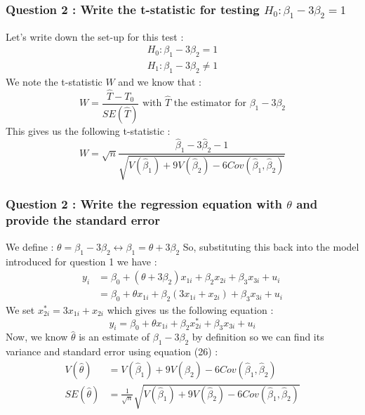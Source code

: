 \documentclass{article}
\begin{document}
\subsubsection{Question 2 : Write the t-statistic for testing $H_0 : \beta_1 -3\beta_2 = 1$ }
Let's write down the set-up for this test : 
\begin{equation}
\begin{aligned}
    H_0 : \beta_1 -3\beta_2 = 1 \\
    H_1 : \beta_1 -3\beta_2 \neq 1
\end{aligned}
\end{equation}
We note the t-statistic $W$ and we know that : 
\begin{equation}
    W = \frac{\hat{T}-T_0}{SE(\hat{T})} \text{ with $\hat{T}$ the estimator for $\beta_1 -3\beta_2$}
\end{equation}
This gives us the following t-statistic : 
\begin{equation}
    W = \sqrt{n}\frac{\hat{\beta}_1 - 3\hat{\beta}_2 - 1}{\sqrt{V(\hat{\beta}_1) + 9V(\hat{\beta}_2) - 6Cov(\hat{\beta}_1, \hat{\beta}_2)}}
\end{equation}

\subsubsection{Question 2 : Write the regression equation with $\theta$ and provide the standard error}
We define : $\theta = \beta_1 - 3\beta_2 \leftrightarrow \beta_1 = \theta + 3\beta_2$
So, substituting this back into the model introduced for question 1 we have : 
\begin{equation}
\begin{aligned}
    y_i &= \beta_0 + (\theta + 3\beta_2)x_{1i} + \beta_2x_{2i} + \beta_3x_{3i} + u_i\\
    &=\beta_0 + \theta x_{1i}+\beta_2(3x_{1i}+x_{2i})+\beta_3x_{3i} + u_i
\end{aligned}
\end{equation}
We set $x_{2i}^*= 3x_{1i}+x_{2i}$ which gives us the following equation : 
\begin{equation}
    y_i = \beta_0 + \theta x_{1i} + \beta_2x_{2i}^* + \beta_3x_{3i}+u_i
\end{equation}
Now, we know $\hat{\theta}$ is an estimate of $\beta_1-3\beta_2$ by definition so we can find its variance and standard error using equation (26) :
\begin{equation}
\begin{aligned}
    V(\hat{\theta}) &= V(\hat{\beta}_1) + 9V(\hat{\beta}_2)- 6Cov(\hat{\beta}_1,\hat{\beta}_2)\\
    SE(\hat{\theta}) &= \frac{1}{\sqrt{n}}\sqrt{V(\hat{\beta}_1) + 9V(\hat{\beta}_2) - 6Cov(\hat{\beta}_1, \hat{\beta}_2)}
\end{aligned}
\end{equation}
\end{document}

